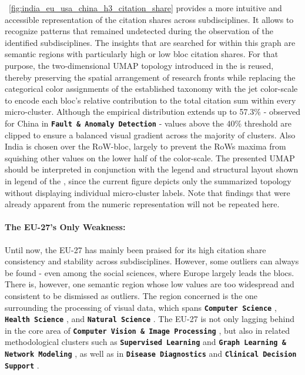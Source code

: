 \documentclass{article}
\begin{document}
	\figurename~\ref{fig:india_eu_usa_china_h3_citation_share} provides a more intuitive and accessible representation of the citation shares across subdisciplines. It allows to recognize patterns that remained undetected during the observation of the identified subdisciplines. The insights that are searched for within this graph are semantic regions with particularly high or low bloc citation shares. For that purpose, the two-dimensional UMAP topology introduced in the  is reused, thereby preserving the spatial arrangement of research fronts while replacing the categorical color assignments of the established taxonomy with the jet color-scale to encode each bloc’s relative contribution to the total citation sum within every micro-cluster. Although the empirical distribution extends up to 57.3\% - observed for China in \textbf{\texttt{Fault \& Anomaly Detection}}  - values above the 40\% threshold are clipped to ensure a balanced visual gradient across the majority of clusters. Also India is chosen over the RoW-bloc, largely to prevent the RoWs maxima from squishing other values on the lower half of the color-scale. The presented UMAP should be interpreted in conjunction with the legend and structural layout shown in legend of the , since the current figure depicts only the summarized topology without displaying individual micro-cluster labels. Note that findings that were already apparent from the numeric representation will not be repeated here.
	
	\paragraph{The EU-27's Only Weakness:} Until now, the EU-27 has mainly been praised for its high citation share consistency and stability across subdisciplines. However, some outliers can always be found - even among the social sciences, where Europe largely leads the blocs. There is, however, one semantic region whose low values are too widespread and consistent to be dismissed as outliers. The region concerned is the one surrounding the processing of visual data, which spans \textbf{\texttt{Computer Science}} , \textbf{\texttt{Health Science}} , and \textbf{\texttt{Natural Science}} . The EU-27 is not only lagging behind in the core area of \textbf{\texttt{Computer Vision \& Image Processing}} , but also in related methodological clusters such as \textbf{\texttt{Supervised Learning}}  and \textbf{\texttt{Graph Learning \& Network Modeling}} , as well as in \textbf{\texttt{Disease Diagnostics}}  and \textbf{\texttt{Clinical Decision Support}} .
	
\end{document}
